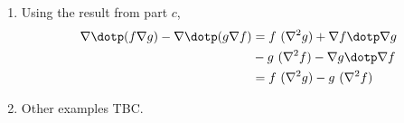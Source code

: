 \begin{enumerate}
\begin{enumerate}
              \item Using the result from part $ c $,
                    \begin{align}
                        \nabla \dotp (f \nabla g) - \nabla \dotp (g \nabla f) & =
                        f\ (\nabla^2 g) + \nabla f \dotp \nabla g                 \\
                                                                              & -
                        g\ (\nabla^2 f) - \nabla g \dotp \nabla f                 \\
                                                                              & =
                        f\ (\nabla^2 g) - g\ (\nabla^2 f)
                    \end{align}

              \item Other examples TBC.
          \end{enumerate}


\end{enumerate}
